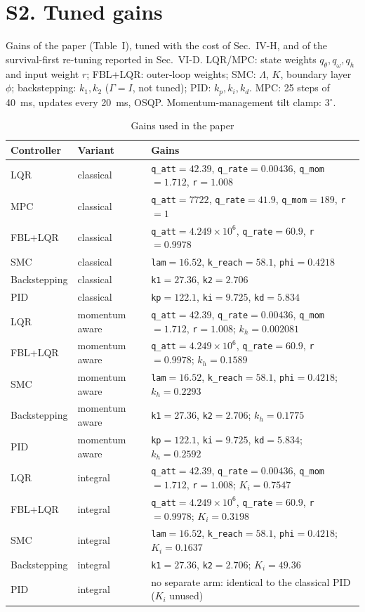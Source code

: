 \documentclass[conference]{IEEEtran}
\begin{document}
\section*{S2. Tuned gains}
Gains of the paper (Table~I), tuned with the cost of Sec.~IV-H, and of the survival-first re-tuning reported in Sec.~VI-D. LQR/MPC: state weights $q_\theta,q_\omega,q_h$ and input weight $r$; FBL+LQR: outer-loop weights; SMC: $\Lambda$, $K$, boundary layer $\phi$; backstepping: $k_1,k_2$ ($\Gamma=I$, not tuned); PID: $k_p,k_i,k_d$. MPC: 25 steps of 40~ms, updates every 20~ms, OSQP. Momentum-management tilt clamp: 3$^\circ$.
\begin{table}[h]\centering\scriptsize
\caption{Gains used in the paper}
\begin{tabular}{@{}llp{}@{}}
\toprule
Controller & Variant & Gains \\
\midrule
LQR & classical & \texttt{q\_att}$=42.39$, \texttt{q\_rate}$=0.00436$, \texttt{q\_mom}$=1.712$, \texttt{r}$=1.008$ \\
MPC & classical & \texttt{q\_att}$=7722$, \texttt{q\_rate}$=41.9$, \texttt{q\_mom}$=189$, \texttt{r}$=1$ \\
FBL+LQR & classical & \texttt{q\_att}$=4.249\times10^{6}$, \texttt{q\_rate}$=60.9$, \texttt{r}$=0.9978$ \\
SMC & classical & \texttt{lam}$=16.52$, \texttt{k\_reach}$=58.1$, \texttt{phi}$=0.4218$ \\
Backstepping & classical & \texttt{k1}$=27.36$, \texttt{k2}$=2.706$ \\
PID & classical & \texttt{kp}$=122.1$, \texttt{ki}$=9.725$, \texttt{kd}$=5.834$ \\
LQR & momentum aware & \texttt{q\_att}$=42.39$, \texttt{q\_rate}$=0.00436$, \texttt{q\_mom}$=1.712$, \texttt{r}$=1.008$; $k_h=0.002081$ \\
FBL+LQR & momentum aware & \texttt{q\_att}$=4.249\times10^{6}$, \texttt{q\_rate}$=60.9$, \texttt{r}$=0.9978$; $k_h=0.1589$ \\
SMC & momentum aware & \texttt{lam}$=16.52$, \texttt{k\_reach}$=58.1$, \texttt{phi}$=0.4218$; $k_h=0.2293$ \\
Backstepping & momentum aware & \texttt{k1}$=27.36$, \texttt{k2}$=2.706$; $k_h=0.1775$ \\
PID & momentum aware & \texttt{kp}$=122.1$, \texttt{ki}$=9.725$, \texttt{kd}$=5.834$; $k_h=0.2592$ \\
LQR & integral & \texttt{q\_att}$=42.39$, \texttt{q\_rate}$=0.00436$, \texttt{q\_mom}$=1.712$, \texttt{r}$=1.008$; $K_i=0.7547$ \\
FBL+LQR & integral & \texttt{q\_att}$=4.249\times10^{6}$, \texttt{q\_rate}$=60.9$, \texttt{r}$=0.9978$; $K_i=0.3198$ \\
SMC & integral & \texttt{lam}$=16.52$, \texttt{k\_reach}$=58.1$, \texttt{phi}$=0.4218$; $K_i=0.1637$ \\
Backstepping & integral & \texttt{k1}$=27.36$, \texttt{k2}$=2.706$; $K_i=49.36$ \\
PID & integral & no separate arm: identical to the classical PID ($K_i$ unused) \\
\bottomrule
\end{tabular}
\end{table}
\end{document}
